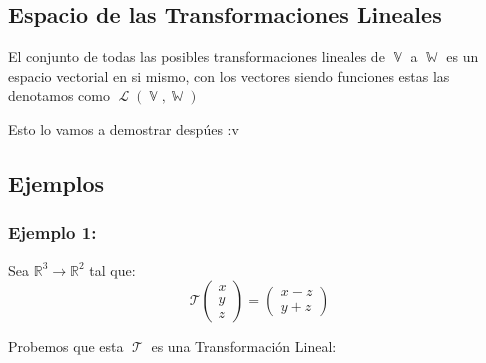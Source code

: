 \documentclass[12pt, fleqn]{report}                             %
\theoremstyle{break}                                            %
\DeclareMathOperator \VectorSet    {\mathbb{V}}                 %
\DeclareMathOperator \SubVectorSet {\mathbb{W}}                 %
\DeclareMathOperator \LinTrans      {\mathcal{T}}               %
\DeclareMathOperator \Laplace       {\mathcal{L}}               %
\newcommand{\VecLinTrans}[1]{\mathcal{T}\pVector{#1}}           %
\newcommand{\pVector}[1]                                        %
        { \ensuremath{\begin{pmatrix}#1\end{pmatrix}} }             %
\begin{document}
            \vspace{1em}
            \subsection{Espacio de las Transformaciones Lineales}


                El conjunto de todas las posibles transformaciones lineales de $\VectorSet$
                a $\SubVectorSet$ es un espacio vectorial en si mismo, con los vectores
                siendo funciones estas las denotamos como $\Laplace(\VectorSet, \SubVectorSet)$

                Esto lo vamos a demostrar despúes :v




            \clearpage
            \subsection{Ejemplos}

                \subsubsection{Ejemplo 1:}
                    Sea $\mathbb{R}^3 \to \mathbb{R}^2$ tal que:
                    \begin{equation*}
                        \VecLinTrans{x\\y\\z}  = \pVector{x-z\\y+z}
                    \end{equation*}

                    Probemos que esta $\LinTrans$ es una Transformación Lineal:
\end{document}
